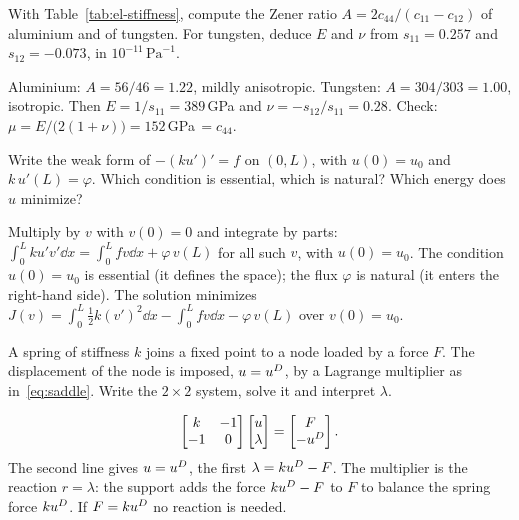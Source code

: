 \label{exo:q-zener}
%
With Table~\ref{tab:el-stiffness}, compute the Zener ratio
$A=2c_{44}/(c_{11}-c_{12})$ of aluminium and of tungsten. For tungsten,
deduce $E$ and $\nu$ from $s_{11}=0.257$ and $s_{12}=-0.073$, in
$10^{-11}\,\mathrm{Pa}^{-1}$.
\begin{solution}
Aluminium: $A=56/46=1.22$, mildly anisotropic. Tungsten: $A=304/303=1.00$,
isotropic. Then $E=1/s_{11}=389$\,GPa and $\nu=-s_{12}/s_{11}=0.28$. Check:
$\mu=E/\bigl(2(1+\nu)\bigr)=152$\,GPa$\,=c_{44}$.
\end{solution}

\label{exo:q-weak}
%
Write the weak form of $-(ku')'=f$ on $(0,L)$, with $u(0)=u_0$ and
$k\,u'(L)=\varphi$. Which condition is essential, which is natural? Which
energy does $u$ minimize?
\begin{solution}
Multiply by $v$ with $v(0)=0$ and integrate by parts:
$\displaystyle \int_0^Lku'v'\dd x=\int_0^Lfv\dd x+\varphi\,v(L)$ for all such $v$, with
$u(0)=u_0$. The condition $u(0)=u_0$ is essential (it defines the space); the
flux $\varphi$ is natural (it enters the right-hand side). The solution
minimizes
$\displaystyle J(v)=\int_0^L\tfrac12k(v')^2\dd x-\int_0^Lfv\dd x-\varphi\,v(L)$ over
$v(0)=u_0$.
\end{solution}

\label{exo:q-saddle}
%
A spring of stiffness $k$ joins a fixed point to a node loaded by a force $F$.
The displacement of the node is imposed, $u=u^{D}$, by a Lagrange multiplier as
in~\eqref{eq:saddle}. Write the $2\times2$ system, solve it and interpret
$\lambda$.
\begin{solution}
\[
\begin{bmatrix}k&-1\\-1&0\end{bmatrix}\begin{bmatrix}u\\ \lambda\end{bmatrix}
=\begin{bmatrix}F\\ -u^{D}\end{bmatrix}.
\]
The second line gives $u=u^{D}$, the first
$\lambda=ku^{D}-F$. The multiplier is the reaction $r=\lambda$: the support adds
the force $ku^{D}-F$ to $F$ to balance the spring force $ku^{D}$. If $F=ku^{D}$ no
reaction is needed.
\end{solution}

